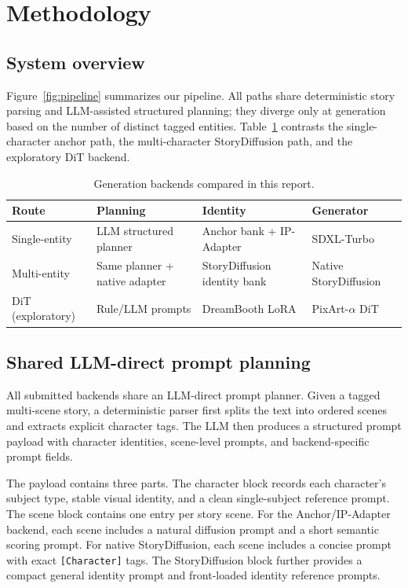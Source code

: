 \section{Methodology}
\label{sec:method}

\subsection{System overview}
Figure~\ref{fig:pipeline} summarizes our pipeline.
All paths share deterministic story parsing and LLM-assisted structured planning; they diverge only at generation based on the number of distinct tagged entities.
Table~\ref{tab:pipeline_comparison} contrasts the single-character anchor path, the multi-character StoryDiffusion path, and the exploratory DiT backend.

\begin{table}[!t]
  \centering
  \small
  \caption{Generation backends compared in this report.}
  \label{tab:pipeline_comparison}
  \begin{tabular}{p{}p{}p{}p{}}
    \toprule
    \textbf{Route} & \textbf{Planning} & \textbf{Identity} & \textbf{Generator} \\
    \midrule
    Single-entity & LLM structured planner & Anchor bank + IP-Adapter & SDXL-Turbo \\
    Multi-entity & Same planner + native adapter & StoryDiffusion identity bank & Native StoryDiffusion \\
    DiT (exploratory) & Rule/LLM prompts & DreamBooth LoRA & PixArt-$\alpha$ DiT \\
    
    \bottomrule
  \end{tabular}
\end{table}

\subsection{Shared LLM-direct prompt planning}
\label{sec:prompt}

All submitted backends share an LLM-direct prompt planner. Given a tagged multi-scene story, a deterministic parser first splits the text into ordered scenes and extracts explicit character tags. The LLM then produces a structured prompt payload with character identities, scene-level prompts, and backend-specific prompt fields.

The payload contains three parts. The character block records each character's subject type, stable visual identity, and a clean single-subject reference prompt. The scene block contains one entry per story scene. For the Anchor/IP-Adapter backend, each scene includes a natural diffusion prompt and a short semantic scoring prompt. For native StoryDiffusion, each scene includes a concise prompt with exact \texttt{[Character]} tags. The StoryDiffusion block further provides a compact general identity prompt and front-loaded identity reference prompts.

